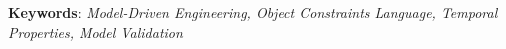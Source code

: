 \begin{small}
\textbf{Keywords}: \textit{Model-Driven Engineering, Object Constraints Language, Temporal Properties, Model Validation}

\end{small}

